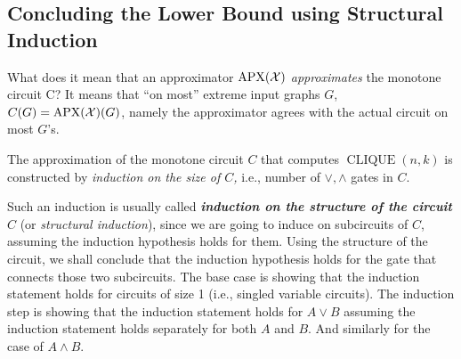 %


\subsection{Concluding the Lower Bound using Structural Induction}\label{sec:Concluding-monotone-lower-bound-str-ind}



% 



What does it mean that an approximator $\mathrm{APX}(\mathcal X)$ \emph{approximates} the monotone circuit C? It means that ``on most'' extreme input graphs $G$, $C(G) = \mathrm{APX}(\mathcal X)(G)$, namely the approximator agrees with the actual circuit on most $G$'s. 

The approximation of the  monotone circuit $C$ that computes $\operatorname{CLIQUE}(n, k)$ is constructed  by\emph{ induction on the size of $C$,} i.e., number of $\lor, \wedge$ gates in $C$.


\begin{tcolorbox}[colframe=white, colback=gray!11, boxrule=0mm, sharp corners]
\begin{note} Such an induction is usually called \emph{\textbf{induction on the structure of the circuit} $C$} (or \emph{structural induction}), since we are going to induce on subcircuits of $C$, assuming the induction hypothesis holds for them. Using the structure of the circuit, we shall conclude that the induction hypothesis  holds for the gate that connects those two subcircuits. The base case is showing that the induction statement holds for circuits of size 1 (i.e., singled variable circuits). The induction step is showing that the induction statement holds for $A\lor B$ assuming the induction statement holds separately for both $A$ and $B$. And similarly for the case of $A\land B$.     
\end{note}
\end{tcolorbox}

